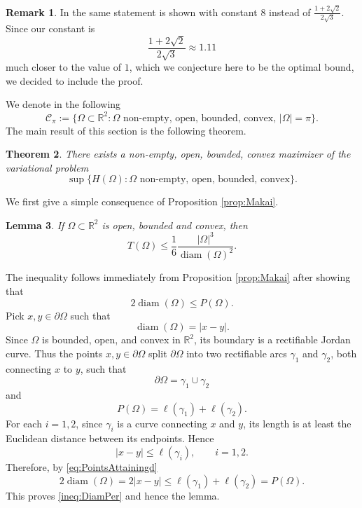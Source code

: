 \documentclass[11pt]{article}
\theoremstyle{plain}
\numberwithin{equation}{section}
\newtheorem{theorem}{Theorem}[section]
\newtheorem{lemma}[theorem]{Lemma}
\theoremstyle{definition}
\newtheorem{remark}[theorem]{Remark}
\let\oldendproof\endproof
\renewenvironment{proof}[1][\proofname]{%
\oldproof[\upshape \bfseries #1]%
}{\oldendproof}
\DeclareMathOperator{\diam}{diam}
\def \Om{\Omega}
\def \R {\mathbb{R}}
\def \p{\partial}
\def \mc{\mathcal}
\begin{document}
    \begin{remark}
        In \cite[Theorem 4]{van2023some} the same statement is shown with constant $8$ instead of $\frac{1+2\sqrt 2}{2\sqrt 3}$. Since our constant is
        \[
        \frac{1+2\sqrt 2}{2\sqrt 3}\approx1.11
        \]
        much closer to the value of $1$, which we conjecture here to be the optimal bound, we decided to include the proof.
    \end{remark}
    We denote in the following
    \[
        \mc C_\pi:=\{\Om \subset \R^2 :\Om \text{ non-empty, open, bounded, convex, }|\Om|=\pi\}.
    \]
    The main result of this section is the following theorem.
    \begin{theorem}
        \label{thm:ExistenceOfMaximizer}
        There exists a non-empty, open, bounded, convex maximizer of the variational problem
        \[
        \sup\{H(\Om): \Om \text{ non-empty, open, bounded, convex}\}.
        \]
    \end{theorem}
    We first give a simple consequence of Proposition \ref{prop:Makai}.
    \begin{lemma}
        \label{lem:consequenceOfMakai}
        If $\Om \subset \R^2$ is open, bounded and convex, then
        \[
        T(\Om)\leq \frac16 \frac{|\Om|^3}{\diam(\Om)^2}.
        \]
    \end{lemma}
    \begin{proof}
        The inequality follows immediately from Proposition \ref{prop:Makai} after showing that 
        \begin{equation}
            \label{ineq:DiamPer}
            2\diam(\Om) \leq P(\Om).
        \end{equation}
        Pick $x,y \in \p \Om$ such that
        \begin{equation}
            \label{eq:PointsAttainingd}
            \diam(\Om) =|x-y|.
        \end{equation}
        Since $\Om$ is bounded, open, and convex in $\R^2$, its boundary is a rectifiable Jordan curve. Thus the points $x,y\in\p\Om$ split $\p\Om$
        into two rectifiable arcs $\gamma_1$ and $\gamma_2$, both connecting $x$
        to $y$, such that
        \[
        \partial\Omega=\gamma_1\cup\gamma_2
        \]
        and
        \[
        P(\Omega)=\ell(\gamma_1)+\ell(\gamma_2).
        \]
        For each $i=1,2$, since $\gamma_i$ is a curve connecting $x$ and $y$,
        its length is at least the Euclidean distance between its endpoints. Hence
        \[
        |x-y|\leq \ell(\gamma_i), \qquad i=1,2.
        \]
        Therefore, by \eqref{eq:PointsAttainingd}
        \[
        2\diam(\Omega)
        =2|x-y|
        \leq \ell(\gamma_1)+\ell(\gamma_2)
        =P(\Omega).
        \]
        This proves \eqref{ineq:DiamPer} and hence the lemma.
    \end{proof}
\end{document}

